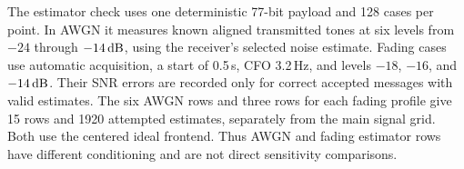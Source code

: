 The estimator check uses one deterministic 77-bit payload and 128 cases
per point. In AWGN it measures known aligned transmitted tones at six
levels from $-24$ through $-14\,\mathrm{dB}$, using the receiver's selected noise
estimate. Fading cases use automatic acquisition, a start of 0.5\,s,
CFO 3.2\,Hz, and levels $-18$, $-16$, and $-14\,\mathrm{dB}$. Their SNR errors
are recorded only for correct accepted messages with valid estimates.
The six AWGN rows and three rows for each fading profile give 15 rows
and 1920 attempted estimates, separately from the main signal grid.
Both use the centered ideal frontend. Thus AWGN and fading estimator
rows have different conditioning and are not direct sensitivity comparisons.
